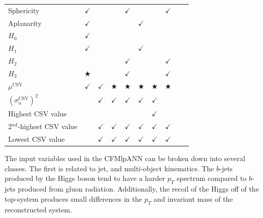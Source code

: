 \begin{table}[htp]
\begin{tabular}{|l|c|c|c|c|c|c|c||c|c|}
Sphericity & $\checkmark$ & & & $\checkmark$ & & & $\checkmark$ \\
Aplanarity & $\checkmark$ & & & & $\checkmark$ & &  \\
$H_0$ & $\checkmark$ & & & & & &   \\
$H_1$ & $\checkmark$ & & & & $\checkmark$ & & \\
$H_2$ & & & & $\checkmark$ & & & $\checkmark$    \\
$H_3$ & $\bigstar$ & & & $\checkmark$ & & & $\checkmark$  \\
$\mu^{\text{CSV}}$ & $\checkmark$ & $\checkmark$ & $\bigstar$ & $\bigstar$ & $\bigstar$ & $\bigstar$ & $\bigstar$  \\
$(\sigma_n^{\text{CSV}})^2$ & & $\checkmark$ & $\checkmark$ & $\checkmark$ & $\checkmark$ & $\checkmark$ &  \\
Highest CSV value & & & & & & $\checkmark$ &  \\
2$^{nd}$-highest CSV value & & $\checkmark$ & $\checkmark$ & $\checkmark$ & $\checkmark$ & $\checkmark$ & $\checkmark$  \\
Lowest CSV value & & $\checkmark$ & $\checkmark$ & $\checkmark$ & $\checkmark$ & $\checkmark$ & $\checkmark$ \\ \hline
 \end{tabular}
\end{table}

\par The input variables used in the CFMlpANN can be broken down into
several classes.  The first is related to jet, and multi-object
kinematics.  The $b$-jets produced by the Higgs boson tend to have a
harder $p_{T}$ spectrum compared to $b$-jets produced from gluon
radiation.  Additionally, the recoil of the Higgs off of the
top-system produces small differences in the $p_{T}$ and invariant
mass of the reconstructed \ttjets system. 

